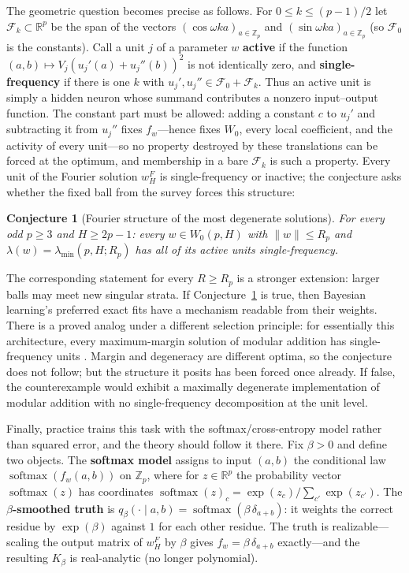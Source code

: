 \documentclass[11pt]{amsart}
\theoremstyle{plain}
\newtheorem{conjecture}[theorem]{Conjecture}
\theoremstyle{definition}
\newcommand{\R}{\mathbb{R}}
\newcommand{\Z}{\mathbb{Z}}
\DeclareMathOperator{\softmax}{softmax}
\begin{document}
The geometric question becomes precise as follows. For $0 \le k \le (p-1)/2$ let $\mathcal F_k \subset \R^p$ be the span of the vectors $(\cos \omega k a)_{a \in \Z_p}$ and $(\sin \omega k a)_{a \in \Z_p}$ (so $\mathcal F_0$ is the constants). Call a unit $j$ of a parameter $w$ \textbf{active} if the function $(a,b) \mapsto V_j (u_j'(a) + u_j''(b))^2$ is not identically zero, and \textbf{single-frequency} if there is one $k$ with $u_j', u_j'' \in \mathcal F_0 + \mathcal F_k$. Thus an active unit is simply a hidden neuron whose summand contributes a nonzero input--output function. The constant part must be allowed: adding a constant $c$ to $u_j'$ and subtracting it from $u_j''$ fixes $f_w$---hence fixes $W_0$, every local coefficient, and the activity of every unit---so no property destroyed by these translations can be forced at the optimum, and membership in a bare $\mathcal F_k$ is such a property. Every unit of the Fourier solution $w^F_H$ is single-frequency or inactive; the conjecture asks whether the fixed ball from the survey forces this structure:

\begin{conjecture}[Fourier structure of the most degenerate solutions]\label{conj:fourier}
For every odd $p \ge 3$ and $H \ge 2p - 1$\textup{:} every $w \in W_0(p, H)$ with $\|w\| \le R_p$ and $\lambda(w) = \lambda_{\min}(p, H; R_p)$ has all of its active units single-frequency.
\end{conjecture}

The corresponding statement for every $R\ge R_p$ is a stronger extension: larger balls may meet new singular strata. If Conjecture~\ref{conj:fourier} is true, then Bayesian learning's preferred exact fits have a mechanism readable from their weights. There is a proved analog under a different selection principle: for essentially this architecture, every maximum-margin solution of modular addition has single-frequency units \cite{morwani2024}. Margin and degeneracy are different optima, so the conjecture does not follow; but the structure it posits has been forced once already. If false, the counterexample would exhibit a maximally degenerate implementation of modular addition with no single-frequency decomposition at the unit level.

Finally, practice trains this task with the softmax/cross-entropy model rather than squared error, and the theory should follow it there. Fix $\beta > 0$ and define two objects. The \textbf{softmax model} assigns to input $(a,b)$ the conditional law $\softmax(f_w(a,b))$ on $\Z_p$, where for $z \in \R^p$ the probability vector $\softmax(z)$ has coordinates $\softmax(z)_c = \exp(z_c)/\sum_{c'} \exp(z_{c'})$. The \textbf{$\beta$-smoothed truth} is $q_\beta(\cdot \mid a,b) = \softmax(\beta\, \delta_{a+b})$: it weights the correct residue by $\exp(\beta)$ against $1$ for each other residue. The truth is realizable---scaling the output matrix of $w^F_H$ by $\beta$ gives $f_w = \beta\,\delta_{a+b}$ exactly---and the resulting $K_\beta$ is real-analytic (no longer polynomial).
\end{document}
